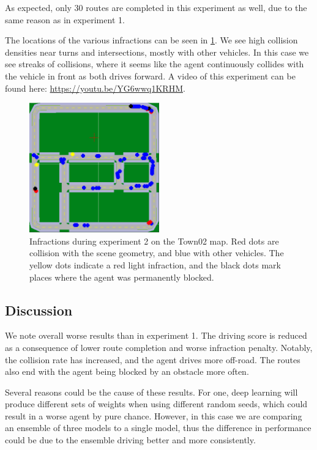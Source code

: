 As expected, only 30 routes are completed in this experiment as well, due to the same reason as in experiment 1.

The locations of the various infractions can be seen in \cref{fig:exp2:town02}.
We see high collision densities near turns and intersections,
mostly with other vehicles.
In this case we see streaks of collisions,
where it seems like the agent continuously collides
with the vehicle in front as both drives forward. 
A video of this experiment can be found here: \url{https://youtu.be/YG6wwq1KRHM}.

\begin{figure}
    \centering
    \includegraphics[width=0.5\textwidth]{figures/results/exp2-town02.png}
    \caption{Infractions during experiment 2 on the Town02 map.
    Red dots are collision with the scene geometry,
    and blue with other vehicles.
    The yellow dots indicate a red light infraction,
    and the black dots mark places where the agent was permanently blocked.}
    \label{fig:exp2:town02}
\end{figure}


\subsection{Discussion}

We note overall worse results than in experiment 1.
The driving score is reduced as a consequence of lower route completion and worse infraction penalty.
Notably, the collision rate has increased,
and the agent drives more off-road.
The routes also end with the agent being blocked by an obstacle more often. 

Several reasons could be the cause of these results.
For one, deep learning will produce different sets of weights when using different random seeds,
which could result in a worse agent by pure chance.
However, in this case we are comparing an ensemble of three models to a single model,
thus the difference in performance could be due to the ensemble driving better and more consistently.

